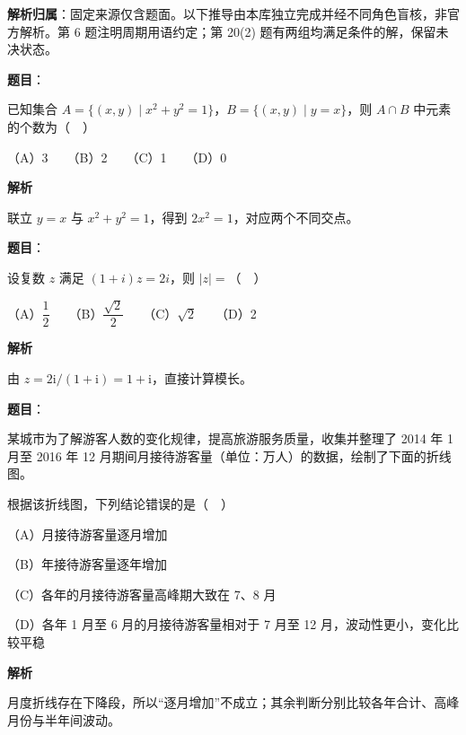 

\begin{gknotice}
\textbf{解析归属}：固定来源仅含题面。以下推导由本库独立完成并经不同角色盲核，非官方解析。第 6 题注明周期用语约定；第 20(2) 题有两组均满足条件的解，保留未决状态。
\end{gknotice}

\begin{answer}

\textbf{题目}：

已知集合 \(A=\{(x,y)\mid x^2+y^2=1\}\)，\(B=\{(x,y)\mid y=x\}\)，则 \(A\cap B\) 中元素的个数为（　）

   （A）3　　（B）2　　（C）1　　（D）0

\textbf{解析}

联立 \(y=x\) 与 \(x^2+y^2=1\)，得到 \(2x^2=1\)，对应两个不同交点。


\end{answer}
\begin{answer}

\textbf{题目}：

设复数 \(z\) 满足 \((1+i)z=2i\)，则 \(|z|=\)（　）

   （A）\(\dfrac12\)　　（B）\(\dfrac{\sqrt2}{2}\)　　（C）\(\sqrt2\)　　（D）2

\textbf{解析}

由 \(z=2\mathrm i/(1+\mathrm i)=1+\mathrm i\)，直接计算模长。


\end{answer}
\begin{answer}

\textbf{题目}：

某城市为了解游客人数的变化规律，提高旅游服务质量，收集并整理了 2014 年 1 月至 2016 年 12 月期间月接待游客量（单位：万人）的数据，绘制了下面的折线图。
\nopagebreak[4]
\begin{center}\end{center}
\nopagebreak[4]
   根据该折线图，下列结论错误的是（　）

   （A）月接待游客量逐月增加

   （B）年接待游客量逐年增加

   （C）各年的月接待游客量高峰期大致在 7、8 月

   （D）各年 1 月至 6 月的月接待游客量相对于 7 月至 12 月，波动性更小，变化比较平稳

\textbf{解析}

月度折线存在下降段，所以“逐月增加”不成立；其余判断分别比较各年合计、高峰月份与半年间波动。


\end{answer}
